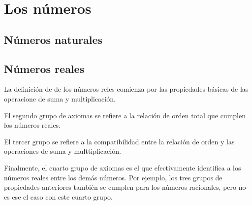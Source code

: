 


\section{Los números}
\subsection{Números naturales}



\subsection{Números reales}

La definición de de los números reles comienza por las propiedades básicas de las operacione de suma y multiplicación.



El segundo grupo de axiomas se refiere a la relación de orden total que cumplen los números reales.



El tercer grupo se refiere a la compatibilidad entre la relación de orden y las operaciones de suma y multtiplicación.



Finalmente, el cuarto grupo de axiomas es el que efectivamente identifica a los números reales entre los demás números. Por ejemplo, los tres grupos de propiedades anteriores también se cumplen para los números racionales, pero no es ese el caso con este cuarto grupo.



